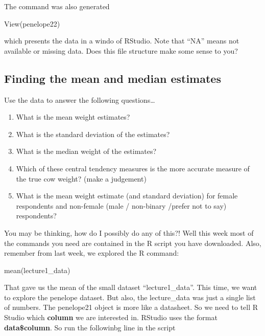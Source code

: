 \documentclass[
]{book}
\newenvironment{Shaded}{\begin{snugshade}}{\end{snugshade}}
\newcommand{\FunctionTok}[1]{\textcolor[rgb]{0.00,0.00,0.00}{#1}}
\newcommand{\NormalTok}[1]{#1}
\providecommand{\tightlist}{%
  \setlength{\itemsep}{0pt}\setlength{\parskip}{0pt}}
\begin{document}
The command was also generated

\begin{Shaded}
\begin{Highlighting}[]
 \FunctionTok{View}\NormalTok{(penelope22)}
\end{Highlighting}
\end{Shaded}

which presents the data in a windo of RStudio. Note that ``NA'' means not available or missing data. Does this file structure make some sense to you?

\hypertarget{finding-the-mean-and-median-estimates}{%
\subsection{Finding the mean and median estimates}\label{finding-the-mean-and-median-estimates}}

Use the data to answer the following questions\ldots{}

\begin{enumerate}
\def\labelenumi{\arabic{enumi}.}
\tightlist
\item
  What is the mean weight estimates?
\item
  What is the standard deviation of the estimates?
\item
  What is the median weight of the estimates?
\item
  Which of these central tendency measures is the more accurate measure of the true cow weight? (make a judgement)
\item
  What is the mean weight estimate (and standard deviation) for female respondents and non-female (male / non-binary /prefer not to say) respondents?
\end{enumerate}

You may be thinking, how do I possibly do any of this?! Well this week most of the commands you need are contained in the R script you have downloaded. Also, remember from last week, we explored the R command:

\begin{Shaded}
\begin{Highlighting}[]
\FunctionTok{mean}\NormalTok{(lecture1\_data)}
\end{Highlighting}
\end{Shaded}

That gave us the mean of the small dataset ``lecture1\_data''. This time, we want to explore the penelope dataset. But also, the lecture\_data was just a single list of numbers. The penelope21 object is more like a datasheet. So we need to tell R Studio which \textbf{column} we are interested in. RStudio uses the format \textbf{data\$column}. So run the followinbg line in the script
\end{document}
